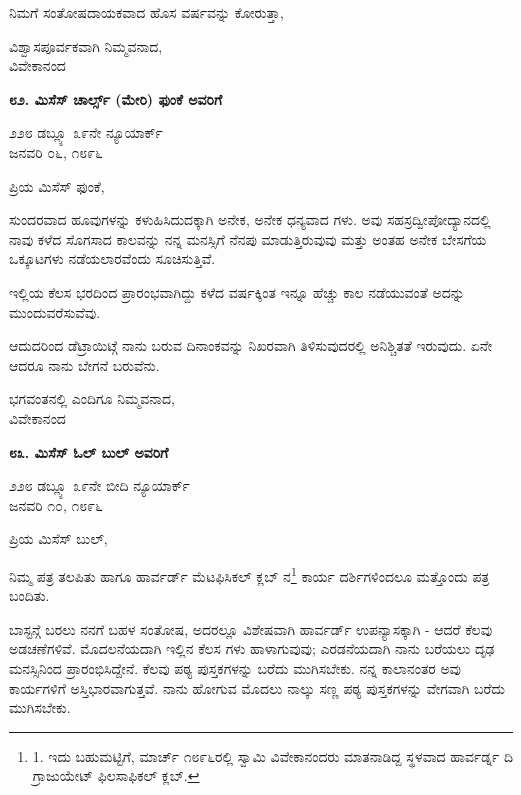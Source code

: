 ನಿಮಗೆ ಸಂತೋಷದಾಯಕವಾದ ಹೊಸ ವರ್ಷವನ್ನು ಕೋರುತ್ತಾ,

\begin{flushright}
ವಿಶ್ವಾಸಪೂರ್ವಕವಾಗಿ ನಿಮ್ಮವನಾದ,\\ವಿವೇಕಾನಂದ
\end{flushright}

\begin{center}
\textbf{೮೨. ಮಿಸೆಸ್ ಚಾರ್ಲ್ಸ್ (ಮೇರಿ) ಫುಂಕೆ ಅವರಿಗೆ}
\end{center}

\begin{flushright}
೨೨೮ ಡಬ್ಲ್ಯೂ ೩೯ನೇ ನ್ಯೂಯಾರ್ಕ್\\ಜನವರಿ ೦೬, ೧೮೯೬
\end{flushright}

ಪ್ರಿಯ ಮಿಸೆಸ್ ಫುಂಕೆ,

ಸುಂದರವಾದ ಹೂವುಗಳನ್ನು ಕಳುಹಿಸಿದುದಕ್ಕಾಗಿ ಅನೇಕ, ಅನೇಕ ಧನ್ಯವಾದ ಗಳು. ಅವು ಸಹಸ್ರದ್ವೀಪೋದ್ಯಾನದಲ್ಲಿ ನಾವು ಕಳೆದ ಸೊಗಸಾದ ಕಾಲವನ್ನು ನನ್ನ ಮನಸ್ಸಿಗೆ ನೆನಪು ಮಾಡುತ್ತಿರುವುವು ಮತ್ತು ಅಂತಹ ಅನೇಕ ಬೇಸಗೆಯ ಒಕ್ಕೂಟಗಳು ನಡೆಯಲಾರವೆಂದು ಸೂಚಿಸುತ್ತಿವೆ.

ಇಲ್ಲಿಯ ಕೆಲಸ ಭರದಿಂದ ಪ್ರಾರಂಭವಾಗಿದ್ದು ಕಳೆದ ವರ್ಷಕ್ಕಿಂತ ಇನ್ನೂ ಹೆಚ್ಚು ಕಾಲ ನಡೆಯುವಂತೆ ಅದನ್ನು ಮುಂದುವರೆಸುವೆವು.

ಆದುದರಿಂದ ಡೆಟ್ರಾಯಿಟ್ಗೆ ನಾನು ಬರುವ ದಿನಾಂಕವನ್ನು ನಿಖರವಾಗಿ ತಿಳಿಸುವುದರಲ್ಲಿ ಅನಿಶ್ಚಿತತೆ ಇರುವುದು. ಏನೇ ಆದರೂ ನಾನು ಬೇಗನೆ ಬರುವೆನು.

\begin{flushright}
ಭಗವಂತನಲ್ಲಿ ಎಂದಿಗೂ ನಿಮ್ಮವನಾದ,\\ವಿವೇಕಾನಂದ
\end{flushright}

\begin{center}
\textbf{೮೩. ಮಿಸೆಸ್ ಓಲ್ ಬುಲ್ ಅವರಿಗೆ}
\end{center}

\begin{flushright}
೨೨೮ ಡಬ್ಲ್ಯೂ ೩೯ನೇ ಬೀದಿ ನ್ಯೂಯಾರ್ಕ್\\ಜನವರಿ ೧೦, ೧೮೯೬
\end{flushright}

ಪ್ರಿಯ ಮಿಸೆಸ್ ಬುಲ್,

ನಿಮ್ಮ ಪತ್ರ ತಲಪಿತು ಹಾಗೂ ಹಾರ್ವರ್ಡ್ ಮೆಟಫಿಸಿಕಲ್ ಕ್ಲಬ್ ನ\footnote{1. ಇದು ಬಹುಮಟ್ಟಿಗೆ, ಮಾರ್ಚ್ ೧೮೯೬ರಲ್ಲಿ ಸ್ವಾಮಿ ವಿವೇಕಾನಂದರು ಮಾತನಾಡಿದ್ದ ಸ್ಥಳವಾದ ಹಾರ್ವರ್ಡ್ನ ದಿ ಗ್ರಾಜುಯೇಟ್ ಫಿಲಸಾಫಿಕಲ್ ಕ್ಲಬ್.} ಕಾರ್ಯ ದರ್ಶಿಗಳಿಂದಲೂ ಮತ್ತೊಂದು ಪತ್ರ ಬಂದಿತು.

ಬಾಸ್ಟನ್ಗೆ ಬರಲು ನನಗೆ ಬಹಳ ಸಂತೋಷ, ಅದರಲ್ಲೂ ವಿಶೇಷವಾಗಿ ಹಾರ್ವರ್ಡ್ ಉಪನ್ಯಾಸಕ್ಕಾಗಿ - ಆದರೆ ಕೆಲವು ಅಡಚಣೆಗಳಿವೆ. ಮೊದಲನೆಯದಾಗಿ ಇಲ್ಲಿನ ಕೆಲಸ ಗಳು ಹಾಳಾಗುವುವು; ಎರಡನೆಯದಾಗಿ ನಾನು ಬರೆಯಲು ದೃಢ ಮನಸ್ಸಿನಿಂದ ಪ್ರಾರಂಭಿಸಿದ್ದೇನೆ. ಕೆಲವು ಪಠ್ಯ ಪುಸ್ತಕಗಳನ್ನು ಬರೆದು ಮುಗಿಸಬೇಕು. ನನ್ನ ಕಾಲಾನಂತರ ಅವು ಕಾರ್ಯಗಳಿಗೆ ಅಸ್ತಿಭಾರವಾಗುತ್ತವೆ. ನಾನು ಹೋಗುವ ಮೊದಲು ನಾಲ್ಕು ಸಣ್ಣ ಪಠ್ಯ ಪುಸ್ತಕಗಳನ್ನು ವೇಗವಾಗಿ ಬರೆದು ಮುಗಿಸಬೇಕು.

